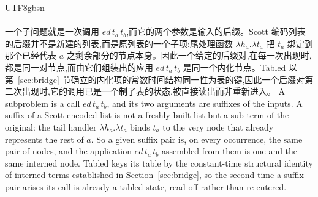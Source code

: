 \begin{CJK*}{UTF8}{gbsn}
  \paragraph{}
  \ifPaperChinese
  一个子问题就是一次调用 $\mathit{ed}\,t_a\,t_b$,而它的两个参数是输入的后缀。Scott 编码列表的后缀并不是新建的列表,而是原列表的一个子项:尾处理函数 $\lambda h_a.\lambda t_a$ 把 $t_a$ 绑定到那个已经代表 $a$ 之剩余部分的节点本身。因此一个给定的后缀对,在每一次出现时,都是同一对节点,而由它们组装出的应用 $\mathit{ed}\,t_a\,t_b$ 是同一个内化节点。\textsf{Tabled} 以第~\ref{sec:bridge} 节确立的内化项的常数时间结构同一性为表的键,因此一个后缀对第二次出现时,它的调用已是一个制了表的状态,被直接读出而非重新进入。
  \else
  A subproblem is a call $\mathit{ed}\,t_a\,t_b$, and its two arguments are suffixes of the inputs. A suffix of a Scott-encoded list is not a freshly built list but a sub-term of the original: the tail handler $\lambda h_a.\lambda t_a$ binds $t_a$ to the very node that already represents the rest of $a$. So a given suffix pair is, on every occurrence, the same pair of nodes, and the application $\mathit{ed}\,t_a\,t_b$ assembled from them is one and the same interned node. \textsf{Tabled} keys its table by the constant-time structural identity of interned terms established in Section~\ref{sec:bridge}, so the second time a suffix pair arises its call is already a tabled state, read off rather than re-entered.
  \fi


\end{CJK*}
